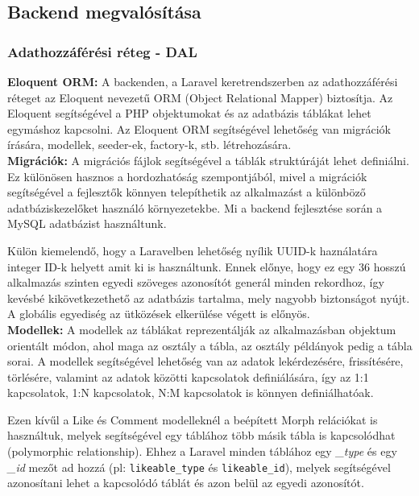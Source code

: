 \subsection{Backend megvalósítása}

\subsubsection{Adathozzáférési réteg - DAL}

\textbf{Eloquent ORM:}
A backenden, a Laravel keretrendszerben az adathozzáférési réteget az Eloquent nevezetű ORM (Object Relational Mapper) biztosítja. Az Eloquent segítségével a PHP objektumokat és az adatbázis táblákat lehet egymáshoz kapcsolni. Az Eloquent ORM segítségével lehetőség van migrációk írására, modellek, seeder-ek, factory-k, stb. létrehozására.\\

\textbf{Migrációk:}
A migrációs fájlok segítségével a táblák struktúráját lehet definiálni. Ez különösen hasznos a hordozhatóság szempontjából, mivel a migrációk segítségével a fejlesztők könnyen telepíthetik az alkalmazást a különböző adatbáziskezelőket használó környezetekbe. Mi a backend fejlesztése során a MySQL adatbázist használtunk.

Külön kiemelendő, hogy a Laravelben lehetőség nyílik UUID-k haználatára integer ID-k helyett amit ki is használtunk. Ennek előnye, hogy ez egy 36 hosszú alkalmazás szinten egyedi szöveges azonosítót generál minden rekordhoz, így kevésbé kikövetkezethető az adatbázis tartalma, mely nagyobb biztonságot nyújt. A globális egyediség az ütközések elkerülése végett is előnyös.\\ 

\textbf{Modellek:}
A modellek az táblákat reprezentálják az alkalmazásban objektum orientált módon, ahol maga az osztály a tábla, az osztály példányok pedig a tábla sorai. A modellek segítségével lehetőség van az adatok lekérdezésére, frissítésére, törlésére, valamint az adatok közötti kapcsolatok definiálására, így az 1:1 kapcsolatok, 1:N kapcsolatok, N:M kapcsolatok is könnyen definiálhatóak.

Ezen kívűl a Like és Comment modelleknél a beépített Morph relációkat is használtuk, melyek segítségével egy táblához több másik tábla is kapcsolódhat (polymorphic relationship). Ehhez a Laravel minden táblához egy \textit{\_type} és egy \textit{\_id} mezőt ad hozzá (pl: \texttt{likeable\_type} és \texttt{likeable\_id}), melyek segítségével azonosítani lehet a kapcsolódó táblát és azon belül az egyedi azonosítót.

